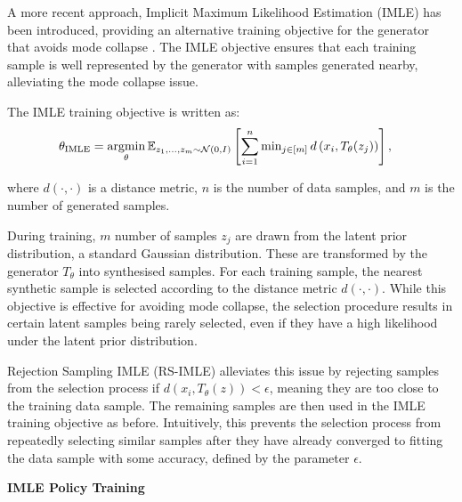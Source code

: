 A more recent approach, Implicit Maximum Likelihood Estimation (IMLE) has been introduced, providing an alternative training objective for the generator that avoids mode collapse \cite{imle}. The IMLE objective ensures that each training sample is well represented by the generator with samples generated nearby, alleviating the mode collapse issue. 

The IMLE training objective \cite{imle} is written as:
\begin{align}
    \theta_{\text{IMLE}}
    &= \operatorname*{argmin}_{\theta} \mathbb{E}_{z_1,...,z_m \sim \mathcal{N}(0, I)}  \left [\sum_{i=1}^n \operatorname{min}\limits_{j\in [m]} d\left( {x}_i, T_\theta({z}_j)\right) \right ],
\label{eqn:imle}
\end{align}

where $d(\cdot,\cdot)$ is a distance metric, $n$ is the number of data samples, and $m$ is the number of generated samples. 

During training, $m$ number of samples $z_j$ are drawn from the latent prior distribution, a standard Gaussian distribution. These are transformed by the generator  $T_\theta$ into synthesised samples. For each training sample, the nearest synthetic sample is selected according to the distance metric $d(\cdot,\cdot)$. While this objective is effective for avoiding mode collapse, the selection procedure results in certain latent samples being rarely selected, even if they have a high likelihood under the latent prior distribution.

Rejection Sampling IMLE (RS-IMLE) \cite{rsimle} alleviates this issue by rejecting samples from the selection process if $d(x_i,T_\theta(z)) < \epsilon$, meaning they are too close to the training data sample. The remaining samples are then used in the IMLE training objective as before. Intuitively, this prevents the selection process from repeatedly selecting similar samples after they have already converged to fitting the data sample with some accuracy, defined by the parameter $\epsilon$.


\begin{algorithm}[t]
\SetAlgoLined
{}
\caption{\textbf{IMLE Policy Training}}
\label{alg:training}


\Return{$\pi_\theta$}
\end{algorithm}

